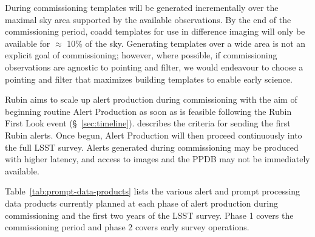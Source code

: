During commissioning templates will be generated incrementally over the maximal sky area supported by the available observations.
By the end of the commissioning period, coadd templates for use in difference imaging will only be available for $\approx$ 10\% of the sky.
Generating templates over a wide area is not an explicit goal of commissioning;  however, where possible, if commissioning observations are agnostic to pointing and filter, we would endeavour to choose a pointing and filter that maximizes building templates to enable early science.

Rubin aims to scale up alert production during commissioning with the aim of beginning routine Alert Production as soon as is feasible following the Rubin First Look event (\S~\ref{sec:timeline}).
 describes the criteria for sending the first Rubin alerts.
Once begun, Alert Production will then proceed continuously into the full LSST survey.
Alerts generated during commissioning may be produced with higher latency, and access to images and the PPDB may not be immediately available.

Table~\ref{tab:prompt-data-products} lists the various alert and prompt processing data products currently planned at each phase of alert production during commissioning and the first two years of the LSST survey. 
Phase 1 covers the commissioning period and phase 2 covers early survey operations.  




